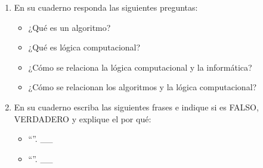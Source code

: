\documentclass[letterpaper,10pt,spanish]{sphinxmanual}
\begin{document}
\begin{enumerate}
\begin{itemize}
\item {} 
\sphinxAtStartPar
Premisa 04: El computador estaba desconectado.

\item {} 
\sphinxAtStartPar
Premisa 05: No hay ningún objeto perdido.

\end{itemize}
\begin{itemize}
\item {} 
\sphinxAtStartPar
{} ?

\item {} 
\sphinxAtStartPar
{} ?

\item {} 
\sphinxAtStartPar
{} ?

\end{itemize}

\item {} 
\sphinxAtStartPar
En su cuaderno responda las siguientes preguntas:
\begin{itemize}
\item {} 
\sphinxAtStartPar
¿Qué es un algoritmo?

\item {} 
\sphinxAtStartPar
¿Qué es lógica computacional?

\item {} 
\sphinxAtStartPar
¿Cómo se relaciona la lógica computacional y la informática?

\item {} 
\sphinxAtStartPar
¿Cómo se relacionan los algoritmos y la lógica computacional?

\end{itemize}

\item {} 
\sphinxAtStartPar
En su cuaderno escriba las siguientes frases e indique si es FALSO, VERDADERO y explique el por qué:
\begin{itemize}
\item {} 
\sphinxAtStartPar
“”. \_\_

\item {} 
\sphinxAtStartPar
“”. \_\_

\end{itemize}

\end{enumerate}
\end{document}
